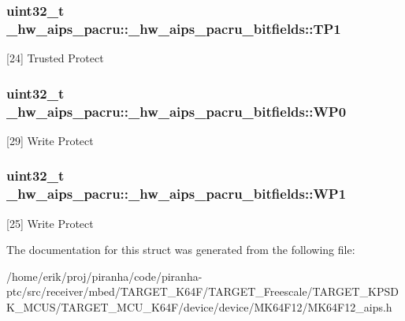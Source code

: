 \subsubsection[{\texorpdfstring{T\+P1}{TP1}}]{\setlength{\rightskip}{0pt plus 5cm}uint32\+\_\+t \+\_\+hw\+\_\+aips\+\_\+pacru\+::\+\_\+hw\+\_\+aips\+\_\+pacru\+\_\+bitfields\+::\+T\+P1}\hypertarget{struct__hw__aips__pacru_1_1__hw__aips__pacru__bitfields_a64e0aad6255be887bf96f100c815962c}{}\label{struct__hw__aips__pacru_1_1__hw__aips__pacru__bitfields_a64e0aad6255be887bf96f100c815962c}
\mbox{[}24\mbox{]} Trusted Protect 
\subsubsection[{\texorpdfstring{W\+P0}{WP0}}]{\setlength{\rightskip}{0pt plus 5cm}uint32\+\_\+t \+\_\+hw\+\_\+aips\+\_\+pacru\+::\+\_\+hw\+\_\+aips\+\_\+pacru\+\_\+bitfields\+::\+W\+P0}\hypertarget{struct__hw__aips__pacru_1_1__hw__aips__pacru__bitfields_a600af1f060763e1d6182e7944c9fa8d5}{}\label{struct__hw__aips__pacru_1_1__hw__aips__pacru__bitfields_a600af1f060763e1d6182e7944c9fa8d5}
\mbox{[}29\mbox{]} Write Protect 
\subsubsection[{\texorpdfstring{W\+P1}{WP1}}]{\setlength{\rightskip}{0pt plus 5cm}uint32\+\_\+t \+\_\+hw\+\_\+aips\+\_\+pacru\+::\+\_\+hw\+\_\+aips\+\_\+pacru\+\_\+bitfields\+::\+W\+P1}\hypertarget{struct__hw__aips__pacru_1_1__hw__aips__pacru__bitfields_a4e87d9ab6566083015b83d6a8119ff55}{}\label{struct__hw__aips__pacru_1_1__hw__aips__pacru__bitfields_a4e87d9ab6566083015b83d6a8119ff55}
\mbox{[}25\mbox{]} Write Protect 

The documentation for this struct was generated from the following file\+:\begin{DoxyCompactItemize}
\item 
/home/erik/proj/piranha/code/piranha-\/ptc/src/receiver/mbed/\+T\+A\+R\+G\+E\+T\+\_\+\+K64\+F/\+T\+A\+R\+G\+E\+T\+\_\+\+Freescale/\+T\+A\+R\+G\+E\+T\+\_\+\+K\+P\+S\+D\+K\+\_\+\+M\+C\+U\+S/\+T\+A\+R\+G\+E\+T\+\_\+\+M\+C\+U\+\_\+\+K64\+F/device/device/\+M\+K64\+F12/M\+K64\+F12\+\_\+aips.\+h\end{DoxyCompactItemize}
